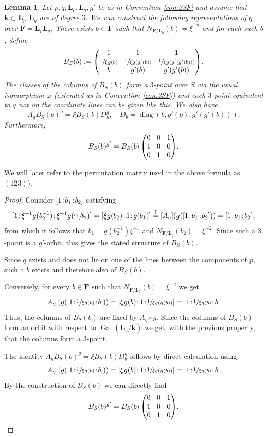\documentclass[JEP,XML,SOM,Unicode,NoFloatCountersInSection, NoEqCountersInSection,published]{cedram}
\newcommand{\sep}{\mkern2mu{:}\mkern2mu}
\DeclareMathOperator{\diag}{diag}
\DeclareMathOperator{\Gal}{Gal}
\newtheorem{lemma}[theorem]{Lemma}
\theoremstyle{definition}
\newcommand{\kk}{{\boldsymbol{k}}}
\newcommand{\FF}{{\boldsymbol{F}}}
\newcommand{\LL}{{\boldsymbol{L}}}
\begin{document}
\begin{lemma} \label{3-pointNonEq}
Let $p,q,\LL_p,\LL_q,g'$ be as in Convention \ref{con:2SF} and assume that $\kk \subset \LL_p, \LL_q$ are of degree $3$. We~can construct the following representations of $q$ over $\FF = \LL_p \LL_q$. There exists $b \in \FF$ such that $N_{\FF / \LL_q}(b) = \xi^{-2}$ and for each such $b$, define
\[\arraycolsep4.5pt
B_S(b) := \begin{pmatrix}
1 & 1 & 1 \\
\sfrac{1}{\xi g(b)} & \sfrac{1}{\xi g(g'(b))} & \sfrac{1}{\xi g(g'(g'(b)))} \\
b & g'(b) & g'(g'(b))
\end{pmatrix}\!.
\]
The classes of the columns of $B_S(b)$ form a $3$\nobreakdash-point over $S$ via the usual isomorphism $\varphi$ (extended as in Convention \ref{con:2SF}) and each $3$\nobreakdash-point equivalent to $q$ not on the coordinate lines can be given like this. We~also have
\[
A_gB_S(b)^g = \xi B_S(b) D_b^g, \quad D_b = \diag(b, g'(b),g'(g'(b))).
\]
Furthermore,
\[\arraycolsep4.5pt
B_S(b)^{g'} = B_S(b) \begin{pmatrix}
0 & 0 & 1 \\
1 & 0 & 0 \\
0 & 1 & 0
\end{pmatrix}\!.
\]
\end{lemma}

We will later refer to the permutation matrix used in the above formula as $(123)$).

\begin{proof}
Consider $[1\sep b_1\sep b_2]$ satisfying
\[
[1\sep \xi^{-1}g(b_2^{-1})\sep  \xi^{-1}g(\sfrac{b_1}{b_2})] = [\xi g(b_2)\sep 1\sep g(b_1)] \stackrel{!}{=} [A_g](g([1\sep b_1\sep b_2])) = [1\sep b_1\sep b_2],
\]
from which it follows that $b_1 = g(b_2^{-1})\xi^{-1}$ and $N_{\FF/\LL_q}(b_2) = \xi^{-2} $. Since such a $3$\nobreakdash-point is a $g'$-orbit, this gives the stated structure of $B_S(b)$.

Since $q$ exists and does not lie on one of the lines between the components of $p$, such a $b$ exists and therefore also of $B_S(b)$.

Conversely, for every $b \in \FF$ such that $N_{\FF / \LL_q}(b) = \xi^{-2}$ we get
\[
[A_g](g([1\sep \sfrac{1}{\xi g(b)}\sep b])) = [\xi g(b)\sep 1\sep \sfrac{1}{\xi g(g(b))}] = [1\sep \sfrac{1}{\xi g(b)}\sep  b].
\]
Thus, the columns of $B_S(b)$ are fixed by $A_g \circ g$. Since the columns of $B_S(b)$ form an orbit with respect to $\Gal(\LL_q/\kk)$ we get, with the previous property, that the columns form a $3$\nobreakdash-point.

The identity $A_gB_S(b)^g = \xi B_S(b) D_b^g$ follows by direct calculation using
\[
[A_g](g([1\sep \sfrac{1}{\xi g(b)}\sep b])) = [\xi g(b)\sep 1\sep \sfrac{1}{\xi g(g(b))}] = [1\sep \sfrac{1}{\xi g(b)}\sep  b].
\]
By the construction of $B_S(b)$ we can directly find
\[\arraycolsep4.5pt
B_S(b)^{g'} = B_S(b) \begin{pmatrix}
0 & 0 & 1 \\
1 & 0 & 0 \\
0 & 1 & 0
\end{pmatrix}\!.\qedhere
\]
\end{proof}
\end{document}
